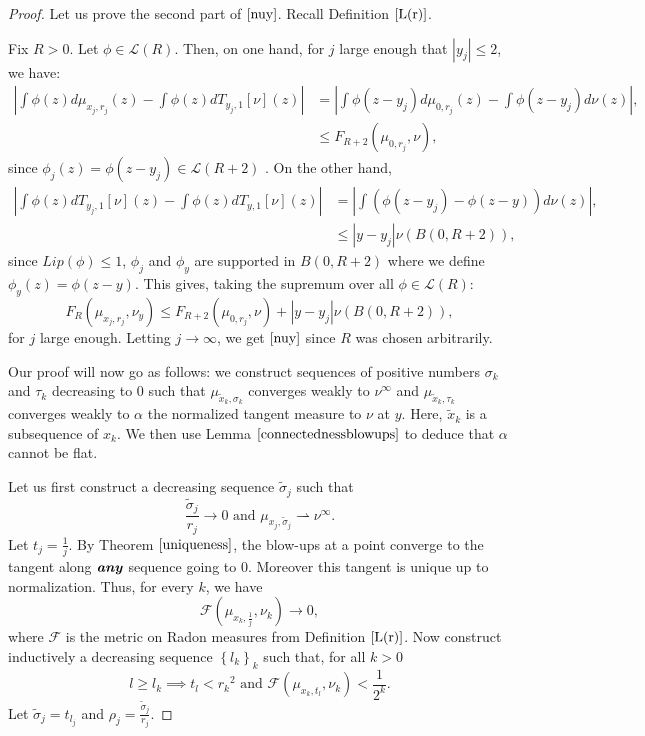 \documentclass[11pt]{article}
\theoremstyle{definition}
\theoremstyle{remark}
\numberwithin{equation}{section}
\begin{document}
\begin{proof}
Let us prove the second part of $\eqref{nuy}$.
Recall Definition $\ref{L(r)}$.

 
Fix $R>0$. Let $\phi \in \mathcal{L}(R)$. Then, on one hand, for $j$ large enough that $|y_j| \leq 2$, we have:
\begin{align}
\left| \int \phi(z) d\mu_{x_j , r_j}(z) - \int \phi(z) dT_{y_j ,1}[\nu](z) \right| 
& =\left| \int \phi( z-y_j) d\mu_{0,r_j}(z) - \int \phi(z-y_j) d\nu(z) \right|, \nonumber \\
&\leq F_{R+2} (\mu_{0,r_j}, \nu) , 
\end{align}
since $\phi_j(z)=\phi(z-y_j) \in \mathcal{L}(R+2)$ .
On the other hand,
\begin{align}
\left| \int \phi(z) dT_{y_j ,1}[\nu](z)- \int \phi(z) dT_{y,1}[\nu](z) \right| &= \left| \int \left(\phi(z-y_j) - \phi(z-y)\right) d\nu(z) \right| , \nonumber \\
&\leq |y-y_j| \nu(B(0,R+2)),
\end{align}
since $Lip(\phi) \leq 1$, $\phi_{j}$ and $\phi_{y}$ are supported in $B(0,R+2)$ where we define $\phi_{y}(z)=\phi(z-y)$.
This gives, taking the supremum over all $\phi \in \mathcal{L}(R)$:
$$ F_R(\mu_{x_j , r_j} , \nu_{y} ) \leq F_{R+2} (\mu_{0,r_j}, \nu)+ |y-y_j| \nu(B(0,R+2)), $$
for $j$ large enough.
Letting $j \to \infty$, we get $\eqref{nuy}$ since $R$ was chosen arbitrarily. 

Our proof will now go as follows: we construct sequences of positive numbers $\sigma_{k}$ and $\tau_{k}$ decreasing to $0$ such that $\mu_{\tilde{x}_k, \sigma_{k}}$ converges weakly to $\nu^{\infty}$ and $\mu_{\tilde{x}_k, \tau_{k}}$ converges weakly to $\alpha$ the normalized tangent measure to $\nu$ at $y$. Here, $\tilde{x}_k$ is a subsequence of $x_k$.
We then use Lemma $\ref{connectednessblowups}$ to deduce that $\alpha$ cannot be flat.

Let us first construct a decreasing sequence $\tilde{\sigma}_j$ such that 
\begin{equation}\label{sigma}
\frac{\tilde{\sigma}_{j}}{r_j} \to 0 \mbox{ and } \mu_{x_j, \tilde{\sigma}_{j}} \rightharpoonup \nu^{\infty}.
\end{equation}
Let $t_{j}=\frac{1}{j}$.
By Theorem $\ref{uniqueness}$, the blow-ups at a point  converge to the tangent along $\textbf{\textit{any}}$ sequence going to 0. Moreover this tangent is unique up to normalization. Thus, for every $k$, we have
$$\mathcal{F}(\mu_{x_k, \frac{1}{j}}, \nu_{k}) \to 0, $$
where $\mathcal{F}$ is the metric on Radon measures from Definition $\ref{L(r)}$.
Now construct inductively a decreasing sequence $\left\lbrace l_{k} \right\rbrace _{k}$
such that, for all $k>0$ 
\begin{equation} \label{convnuinfty}
 l \geq l_k \implies t_{l} < {r_{k}}^{2} \mbox{ and } \mathcal{F}(\mu_{x_{k}, t_{l}} , \nu_{k} ) < \frac{1}{2^{k}}.
\end{equation} 
Let $\tilde{\sigma}_{j} = t_{l_j}$ and $\rho_{j}= \frac{\tilde{\sigma}_{j}}{r_j}$.


\end{proof}
\end{document}
